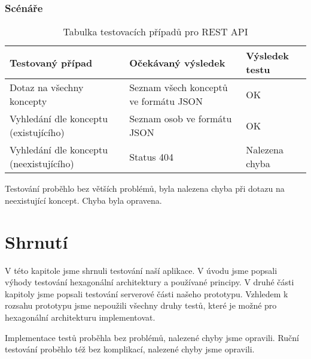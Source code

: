 \subsubsection{Scénáře}
\begin{table}[h!]
\begin{ctucolortab}
\begin{tabularx}{0.95\linewidth}{X|X|X}
\bfseries Testovaný případ  & \bfseries Očekávaný výsledek & \bfseries Výsledek testu\\\hline 
    Dotaz na všechny koncepty & Seznam všech konceptů ve formátu JSON & OK \\\hline
    Vyhledání dle konceptu (existujícího) & Seznam osob ve formátu JSON & OK \\\hline
    Vyhledání dle konceptu (neexistujícího) & Status 404 & Nalezena chyba \\
\end{tabularx}
\end{ctucolortab}
	\caption{Tabulka testovacích případů pro REST API}
	\label{tab:rest-testing}
\end{table}
Testování proběhlo bez větších problémů, byla nalezena chyba při dotazu na neexistující koncept. Chyba byla opravena.
\section{Shrnutí}
V této kapitole jsme shrnuli testování naší aplikace. V úvodu jsme popsali výhody testování hexagonální architektury a používané principy. V druhé části kapitoly jsme popsali testování serverové části našeho prototypu. Vzhledem k rozsahu prototypu jsme nepoužili všechny druhy testů, které je možné pro hexagonální architekturu implementovat.\par
Implementace testů proběhla bez problémů, nalezené chyby jsme opravili. Ruční testování proběhlo též bez komplikací, nalezené chyby jsme opravili.






